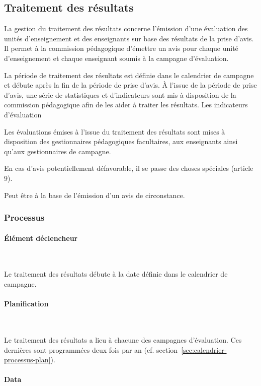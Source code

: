 \documentclass[a4paper,11pt]{report}
\begin{document}
\subsection{Traitement des résultats}
La gestion du traitement des résultats concerne l'émission d'une évaluation des unités d'enseignement et des enseignants sur base des résultats de la prise d'avis.
Il permet à la commission pédagogique d'émettre un avis pour chaque unité d'enseignement et chaque enseignant soumis à la campagne d'évaluation.

La période de traitement des résultats est définie dans le calendrier de campagne et débute après la fin de la période de prise d'avis.
À l'issue de la période de prise d'avis, une série de statistiques et d'indicateurs sont mis à disposition de la commission pédagogique afin de les aider à traiter les résultats.
Les indicateurs d'évaluation

Les évaluations émises à l'issue du traitement des résultats sont mises à disposition des gestionnaires pédagogiques facultaires, aux enseignants ainsi qu'aux gestionnaires de campagne.

En cas d'avis potentiellement défavorable, il se passe des choses spéciales (article 9).

Peut être à la base de l'émission d'un avis de circonstance.


\subsubsection{Processus}
\paragraph{Élément déclencheur}~\newline{}

Le traitement des résultats débute à la date définie dans le calendrier de campagne.

\paragraph{Planification}~\newline{}

Le traitement des résultats a lieu à chacune des campagnes d'évaluation.
Ces dernières sont programmées deux fois par an (cf. section~\ref{sec:calendrier-processus-plan}).

\paragraph{Data}~\newline{}
\end{document}
